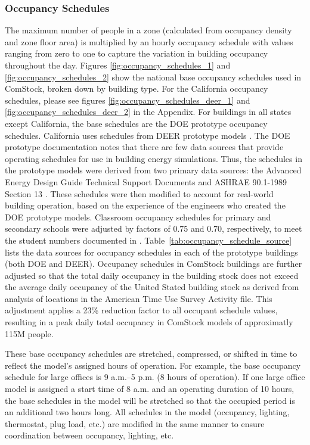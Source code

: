 \subsubsection{Occupancy Schedules}
The maximum number of people in a zone (calculated from occupancy density and zone floor area) is multiplied by an hourly occupancy schedule with values ranging from zero to one to capture the variation in building occupancy throughout the day. Figures \ref{fig:occupancy_schedules_1} and \ref{fig:occupancy_schedules_2} show the national base occupancy schedules used in ComStock, broken down by building type. For the California occupancy schedules, please see figures \ref{fig:occupancy_schedules_deer_1} and \ref{fig:occupancy_schedules_deer_2} in the Appendix. For buildings in all states except California, the base schedules are the DOE prototype occupancy schedules. California uses schedules from DEER prototype models \citep{cpuc_deer}. The DOE prototype documentation \citep{deru_2011} notes that there are few data sources that provide operating schedules for use in building energy simulations. Thus, the schedules in the prototype models were derived from two primary data sources: the Advanced Energy Design Guide Technical Support Documents \citep{jiang_2008,doebber_2009,liu_2007,pless_2007} and ASHRAE 90.1-1989 Section 13 \citep{ashrae_1989}. These schedules were then modified to account for real-world building operation, based on the experience of the engineers who created the DOE prototype models. Classroom occupancy schedules for primary and secondary schools were adjusted by factors of 0.75 and 0.70, respectively, to meet the student numbers documented in \cite{pless_2007}. Table~\ref{tab:occupancy_schedule_source} lists the data sources for occupancy schedules in each of the prototype buildings (both DOE and DEER). Occupancy schedules in ComStock buildings are further adjusted so that the total daily occupancy in the building stock does not exceed the average daily occupancy of the United Stated building stock as derived from analysis of locations in the American Time Use Survey \citep{atus2018} Activity file. This adjustment applies a 23\% reduction factor to all occupant schedule values, resulting in a peak daily total occupancy in ComStock models of approximatly 115M people.

These base occupancy schedules are stretched, compressed, or shifted in time to reflect the model’s assigned hours of operation. For example, the base occupancy schedule for large offices is 9 a.m.--5 p.m. (8 hours of operation). If one large office model is assigned a start time of 8 a.m. and an operating duration of 10 hours, the base schedules in the model will be stretched so that the occupied period is an additional two hours long. All schedules in the model (occupancy, lighting, thermostat, plug load, etc.) are modified in the same manner to ensure coordination between occupancy, lighting, etc.


